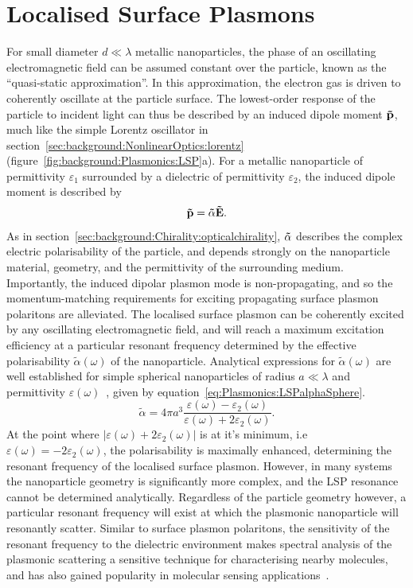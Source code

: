\section{Localised Surface Plasmons}\label{sec:background:Plasmonics:LSP}

For small diameter $d \ll \lambda$ metallic nanoparticles, the phase of an oscillating electromagnetic field can be assumed constant over the particle, known as the ``quasi-static approximation''. In this approximation, the electron gas is driven to coherently oscillate at the particle surface. The lowest-order response of the particle to incident light can thus be described by an induced dipole moment $\bf{\tilde p}$, much like the simple Lorentz oscillator in section~\ref{sec:background:NonlinearOptics:lorentz} (figure~\ref{fig:background:Plasmonics:LSP}a).
For a metallic nanoparticle of permittivity $\varepsilon_1$ surrounded by a dielectric of permittivity $\varepsilon_2$, the induced dipole moment is described by
\begin{equation}\label{eq:Plasmonics:LSPdipole}
    {\bf{\tilde p}} = {\bf{\tilde \alpha }}{\bf{\tilde E}}.
\end{equation}
As in section~\ref{sec:background:Chirality:opticalchirality}, $\bf{\tilde \alpha }$ describes the complex electric polarisability of the particle, and depends strongly on the nanoparticle material, geometry, and the permittivity of the surrounding medium.
Importantly, the induced dipolar plasmon mode is non-propagating, and so the momentum-matching requirements for exciting propagating surface plasmon polaritons are alleviated. The localised surface plasmon can be coherently excited by any oscillating electromagnetic field, and will reach a maximum excitation efficiency at a particular resonant frequency determined by the effective polarisability ${\tilde \alpha }(\omega)$ of the nanoparticle.
Analytical expressions for ${\tilde \alpha }(\omega)$ are well established for simple spherical nanoparticles of radius $a \ll \lambda$ and permittivity $\varepsilon(\omega)$~\cite{Maier2007, Collins2017}, given by equation~\ref{eq:Plasmonics:LSPalphaSphere}. 
\begin{equation}\label{eq:Plasmonics:LSPalphaSphere}
    {\tilde \alpha } = 4\pi a^3 \frac{\varepsilon (\omega) - \varepsilon_2 (\omega)}{\varepsilon (\omega) + 2\varepsilon_2 (\omega)}.
\end{equation}
At the point where $\lvert \varepsilon (\omega) + 2\varepsilon_2 (\omega) \rvert$ is at it's minimum, i.e $\varepsilon (\omega) = -2\varepsilon_2 (\omega)$, the polarisability is maximally enhanced, determining the resonant frequency of the localised surface plasmon. However, in many systems the nanoparticle geometry is significantly more complex, and the LSP resonance cannot be determined analytically. Regardless of the particle geometry however, a particular resonant frequency will exist at which the plasmonic nanoparticle will resonantly scatter. Similar to surface plasmon polaritons, the sensitivity of the resonant frequency to the dielectric environment makes spectral analysis of the plasmonic scattering a sensitive technique for characterising nearby molecules, and has also gained popularity in molecular sensing applications~\cite{Petryayeva2011a, Polavarapu2014, Cheng2015}.


